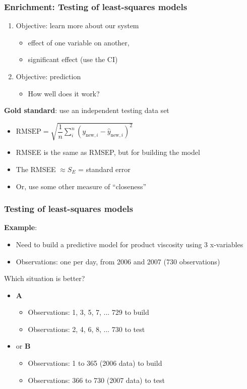 \begin{frame}\frametitle{Enrichment: Testing of least-squares models}
	\begin{enumerate}
		\item	Objective: learn more about our system
		\begin{itemize}
			\item	effect of one variable on another,
			\item	significant effect (use the CI)
		\end{itemize}
		\item	Objective: prediction
		\begin{itemize}
			\item	How well does it work?
		\end{itemize}
	\end{enumerate}

	\textbf{Gold standard}: use an independent testing data set
	\begin{itemize}
		\item	$\text{RMSEP} = \sqrt{\dfrac{1}{n}\sum_{i}^{n}{\left(y_{\text{new}, i} - \hat{y}_{\text{new}, i}\right)^2}}$
		\item	RMSEE is the same as RMSEP, but for building the model
		\item	The RMSEE $\approx S_E$ = standard error
		\item	Or, use some other measure of ``closeness''
	\end{itemize}
\end{frame}

\begin{frame}\frametitle{Testing of least-squares models}

	\textbf{Example}:
	\begin{itemize}
		\item	Need to build a predictive model for product viscosity using 3 x-variables
		\item	Observations: one per day, from 2006 and 2007 (730 observations)
	\end{itemize}

	Which situation is better?
	\begin{itemize}
		\item	\textbf{A}
		\begin{itemize}
			\item	Observations: 1, 3, 5, 7, ... 729 to build
			\item	Observations: 2, 4, 6, 8, ... 730 to test
		\end{itemize}
		\item	or \textbf{B}
		\begin{itemize}
			\item	Observations: 1 to 365 (2006 data) to build
			\item	Observations: 366 to 730 (2007 data) to test
		\end{itemize}
	\end{itemize}
\end{frame}

